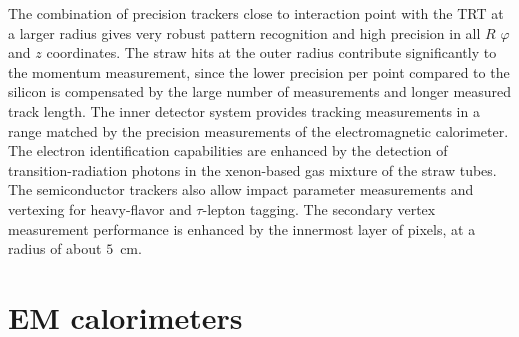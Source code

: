 The combination of precision trackers close to interaction point with the TRT at a larger radius gives very
robust pattern recognition and high precision in all $R$ $\varphi$ and $z$ coordinates. The straw hits at the
outer radius contribute significantly to the momentum measurement, since the lower precision per
point compared to the silicon is compensated by the large number of measurements and longer
measured track length.
The inner detector system provides tracking measurements in a range matched by the precision measurements of the electromagnetic calorimeter. The electron identification capabilities
are enhanced by the detection of transition-radiation photons in the xenon-based gas mixture of
the straw tubes. The semiconductor trackers also allow impact parameter measurements and vertexing for heavy-flavor and $\tau$-lepton tagging. The secondary vertex measurement performance is enhanced by the innermost layer of pixels, at a radius of about $5$~cm.


\section{EM calorimeters}
\label{sec:ATLAS_EM_calo}

\begin{figure}
\end{figure}


